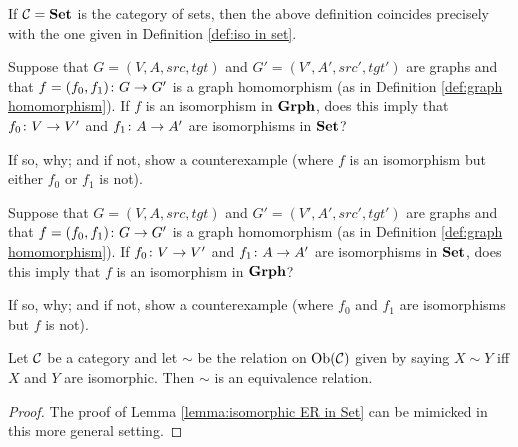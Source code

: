 \documentclass[CT4S-EN-RU]{subfiles}
\begin{document}
\begin{example}

If $\mathcal{C}={\bf Set}$ is the category of sets, then the above definition coincides precisely with the one given in Definition \ref{def:iso in set}.

\end{example}

\begin{exercise}
Suppose that $G=(V,A,src,tgt)$ and $G'=(V',A',src',tgt')$ are graphs and that $f=(f_0,f_1)\colon G\rightarrow G'$ is a graph homomorphism (as in Definition \ref{def:graph homomorphism}). 
\sexc If $f$ is an isomorphism in ${\bf Grph}$, does this imply that $f_0\colon V\rightarrow V'$ and $f_1\colon A\rightarrow A'$ are isomorphisms in ${\bf Set}$?
\item  If so, why; and if not, show a counterexample (where $f$ is an isomorphism but either $f_0$ or $f_1$ is not).
\endsexc
\end{exercise}

\begin{exercise}
Suppose that $G=(V,A,src,tgt)$ and $G'=(V',A',src',tgt')$ are graphs and that $f=(f_0,f_1)\colon G\rightarrow G'$ is a graph homomorphism (as in Definition \ref{def:graph homomorphism}). 
\sexc If $f_0\colon V\rightarrow V'$ and $f_1\colon A\rightarrow A'$ are isomorphisms in ${\bf Set}$, does this imply that $f$ is an isomorphism in ${\bf Grph}$?
\item If so, why; and if not, show a counterexample (where $f_0$ and $f_1$ are isomorphisms but $f$ is not).
\endsexc
\end{exercise}

\begin{lemma}\label{lemma:isomorphic ER}

Let $\mathcal{C}$ be a category and let $\sim$ be the relation on $\textnormal{Ob}(\mathcal{C})$ given by saying $X\sim Y$ iff $X$ and $Y$ are isomorphic. Then $\sim$ is an equivalence relation.

\end{lemma}

\begin{proof}

The proof of Lemma \ref{lemma:isomorphic ER in Set} can be mimicked in this more general setting.

\end{proof}


\subsubsection{}
\end{document}
